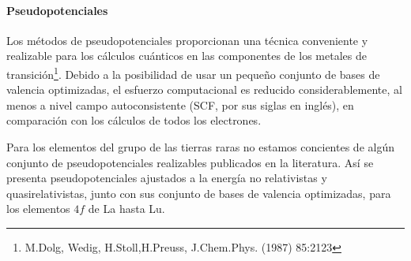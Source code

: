 \paragraph{Pseudopotenciales}
Los m\'etodos de pseudopotenciales proporcionan una t\'ecnica 
conveniente y realizable para los c\'alculos cu\'anticos en las
componentes de los metales de transici\'on\footnote{M.Dolg, Wedig, 
H.Stoll,H.Preuss, J.Chem.Phys. (1987) 85:2123}. Debido a la 
posibilidad de usar un peque\~no conjunto de bases de valencia 
optimizadas, el esfuerzo computacional es reducido considerablemente,
al menos a nivel campo autoconsistente (SCF, por sus siglas en 
ingl\'es), en comparaci\'on con los c\'alculos de todos los 
electrones.

Para los elementos del grupo de las tierras raras no estamos 
concientes de alg\'un conjunto de pseudopotenciales realizables
publicados en la literatura. As\'i se presenta pseudopotenciales
ajustados a la energ\'ia no relativistas y quasirelativistas, junto
con sus conjunto de bases de valencia optimizadas, para los elementos
$4f$ de La hasta Lu.

